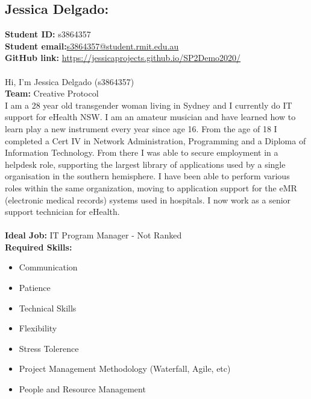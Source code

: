 \documentclass[11pt, oneside, a4paper, titlepage]{article}
\begin{document}
\subsection{Jessica Delgado:}
\textbf{Student ID:} \hfill s3864357\\
\textbf{Student email:}\hfill \href{mailto:s3864357@student.rmit.edu.au}{s3864357@student.rmit.edu.au}\\
\textbf{GitHub link:} \hfill \href{https://jessicaprojects.github.io/SP2Demo2020/}{https://jessicaprojects.github.io/SP2Demo2020/} \\
\\
Hi, I'm Jessica Delgado (s3864357) 
\\
\textbf{Team:} Creative Protocol
\\
I am a 28 year old transgender woman living in Sydney and I currently do IT support for eHealth NSW. I am an amateur musician and have learned how to learn play a new instrument every year since age 16. From the age of 18 I completed a Cert IV in Network Administration, Programming and a Diploma of Information Technology. From there I was able to secure employment in a helpdesk role, supporting the largest library of applications used by a single organisation in the southern hemisphere. I have been able to perform various roles within the same organization, moving to application support for the eMR (electronic medical records) systems used in hospitals. I now work as a senior support technician for eHealth. 
\\
\\
\textbf{Ideal Job:} \hfill IT Program Manager - Not Ranked\\
\textbf{Required Skills:} 
\begin{itemize}
	\setlength\itemsep{0em}
	\item Communication
	\item Patience
	\item Technical Skills
	\item Flexibility
	\item Stress Tolerence
	\item Project Management Methodology (Waterfall, Agile, etc)
	\item People and Resource Management
\end{itemize}
\newpage

\end{document}
